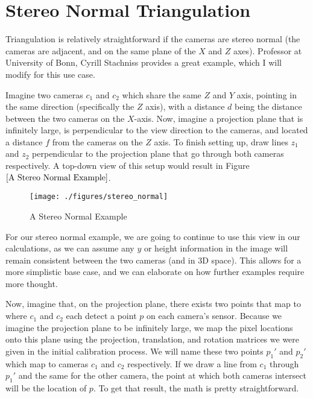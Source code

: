 \documentclass[
    12pt,
    twoside,
    bibstyle=chicago,
    headerstyle=uppercase,
	bibfile=biblatex_updating.bib
]{reedthesis}
\begin{document}
\section{Stereo Normal Triangulation}


Triangulation is relatively straightforward if the cameras are stereo normal (the cameras are adjacent, and on the same plane of the $X$ and $Z$ axes). Professor at University of Bonn, Cyrill Stachniss provides a great example, which I will modify for this use case. \autocite{stachnissLecturePhotogrammetryII2021}

Imagine two cameras $c_1$ and $c_2$ which share the same $Z$ and $Y$ axis, pointing in the same direction (specifically the $Z$ axis), with a distance $d$ being the distance between the two cameras on the $X$-axis. Now, imagine a projection plane that is infinitely large, is perpendicular to the view direction to the cameras, and located a distance $f$ from the cameras on the $Z$ axis. To finish setting up, draw lines $z_1$ and $z_2$ perpendicular to the projection plane that go through both cameras respectively. A top-down view of this setup would result in Figure $\ref{A Stereo Normal Example}$.
	
	\begin{figure}[h]
	   
	       \centering
	        
	    \texttt{[image: ./figures/stereo\_normal]}
	     \caption{A Stereo Normal Example}
	 \label{A Stereo Normal Example}
	\end{figure}

For our stereo normal example, we are going to continue to use this view in our calculations, as we can assume any $y$ or height information in the image will remain consistent between the two cameras (and in 3D space). This allows for a more simplistic base case, and we can elaborate on how further examples require more thought.


Now, imagine that, on the projection plane, there exists two points that map to where $c_1$ and $c_2$ each detect a point $p$ on each camera's sensor. Because we imagine the projection plane to be infinitely large, we map the pixel locations onto this plane using the projection, translation, and rotation matrices we were given in the initial calibration process. We will name these two points $p_1'$ and $p_2'$ which map to cameras $c_1$ and $c_2$ respectively. If we draw a line from $c_1$ through $p_1'$ and the same for the other camera, the point at which both cameras intersect will be the location of $p$. To get that result, the math is pretty straightforward.
\end{document}
